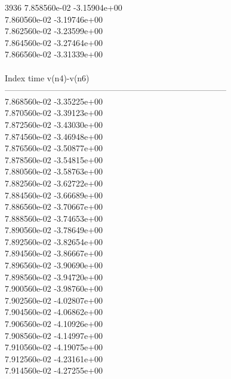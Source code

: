 3936	7.858560e-02	-3.15904e+00	\\ 	7.860560e-02	-3.19746e+00	\\ 	7.862560e-02	-3.23599e+00	\\ 	7.864560e-02	-3.27464e+00	\\ 	7.866560e-02	-3.31339e+00	\\ \hline
\\ \hline
Index   time            v(n4)-v(n6)     \\ \hline
--------------------------------------------------------------------------------\\ 	7.868560e-02	-3.35225e+00	\\ 	7.870560e-02	-3.39123e+00	\\ 	7.872560e-02	-3.43030e+00	\\ 	7.874560e-02	-3.46948e+00	\\ 	7.876560e-02	-3.50877e+00	\\ 	7.878560e-02	-3.54815e+00	\\ 	7.880560e-02	-3.58763e+00	\\ 	7.882560e-02	-3.62722e+00	\\ 	7.884560e-02	-3.66689e+00	\\ 	7.886560e-02	-3.70667e+00	\\ 	7.888560e-02	-3.74653e+00	\\ 	7.890560e-02	-3.78649e+00	\\ 	7.892560e-02	-3.82654e+00	\\ 	7.894560e-02	-3.86667e+00	\\ 	7.896560e-02	-3.90690e+00	\\ 	7.898560e-02	-3.94720e+00	\\ 	7.900560e-02	-3.98760e+00	\\ 	7.902560e-02	-4.02807e+00	\\ 	7.904560e-02	-4.06862e+00	\\ 	7.906560e-02	-4.10926e+00	\\ 	7.908560e-02	-4.14997e+00	\\ 	7.910560e-02	-4.19075e+00	\\ 	7.912560e-02	-4.23161e+00	\\ 	7.914560e-02	-4.27255e+00	\\ \hline
